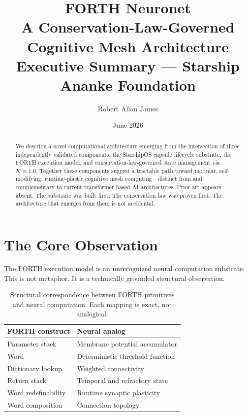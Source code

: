 \documentclass[11pt]{article}
\title{\textbf{FORTH Neuronet}\\
       \large A Conservation-Law-Governed Cognitive Mesh Architecture\\[0.5em]
       \normalsize Executive Summary --- Starship Ananke Foundation}
\author{Robert Allan James}
\date{June 2026}
\begin{document}
\maketitle

\begin{abstract}
We describe a novel computational architecture emerging from the intersection
of three independently validated components: the StarshipOS capsule lifecycle
substrate, the FORTH execution model, and conservation-law-governed state
management via $K \equiv 1.0$. Together these components suggest a tractable
path toward modular, self-modifying, runtime-plastic cognitive mesh
computing---distinct from and complementary to current transformer-based AI
architectures. Prior art appears absent. The substrate was built first. The
conservation law was proven first. The architecture that emerges from them is
not accidental.
\end{abstract}

\tableofcontents
\newpage

\section{The Core Observation}

The FORTH execution model is an unrecognized neural computation substrate.
This is not metaphor. It is a technically grounded structural observation.

\begin{table}[h]
\centering
\begin{tabular}{@{}ll@{}}
\toprule
\textbf{FORTH construct} & \textbf{Neural analog} \\
\midrule
Parameter stack          & Membrane potential accumulator \\
Word                     & Deterministic threshold function \\
Dictionary lookup        & Weighted connectivity \\
Return stack             & Temporal and refractory state \\
Word redefinability      & Runtime synaptic plasticity \\
Word composition         & Connection topology \\
\bottomrule
\end{tabular}
\caption{Structural correspondence between FORTH primitives and neural
         computation. Each mapping is exact, not analogical.}
\end{table}
\end{document}
